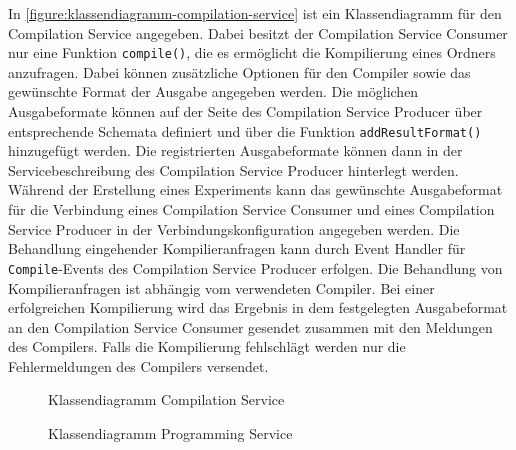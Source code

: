 In \autoref{figure:klassendiagramm-compilation-service} ist ein Klassendiagramm für den Compilation Service angegeben. Dabei besitzt der Compilation Service Consumer nur eine Funktion \texttt{compile()}, die es ermöglicht die Kompilierung eines Ordners anzufragen. Dabei können zusätzliche Optionen für den Compiler sowie das gewünschte Format der Ausgabe angegeben werden. Die möglichen Ausgabeformate können auf der Seite des Compilation Service Producer über entsprechende Schemata definiert und über die Funktion \texttt{addResultFormat()} hinzugefügt werden. Die registrierten Ausgabeformate können dann in der Servicebeschreibung des Compilation Service Producer hinterlegt werden. Während der Erstellung eines Experiments kann das gewünschte Ausgabeformat für die Verbindung eines Compilation Service Consumer und eines Compilation Service Producer in der Verbindungskonfiguration angegeben werden. Die Behandlung eingehender Kompilieranfragen kann durch Event Handler für \texttt{Compile}-Events des Compilation Service Producer erfolgen. Die Behandlung von Kompilieranfragen ist abhängig vom verwendeten Compiler. Bei einer erfolgreichen Kompilierung wird das Ergebnis in dem festgelegten Ausgabeformat an den Compilation Service Consumer gesendet zusammen mit den Meldungen des Compilers. Falls die Kompilierung fehlschlägt werden nur die Fehlermeldungen des Compilers versendet.

\begin{figure}[tbp]
    \centering
    \caption{Klassendiagramm Compilation Service}
    \label{figure:klassendiagramm-compilation-service}
\end{figure}

\begin{figure}[tbp]
    \centering
    \caption{Klassendiagramm Programming Service}
    \label{figure:klassendiagramm-programming-service}
\end{figure}

